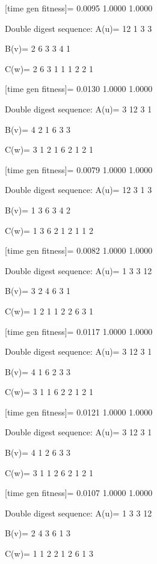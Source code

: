 [time gen fitness]=
    0.0095    1.0000    1.0000

Double digest sequence:
A(u)=
    12     1     3     3

B(v)=
     2     6     3     3     4     1

C(w)=
     2     6     3     1     1     1     2     2     1

[time gen fitness]=
    0.0130    1.0000    1.0000

Double digest sequence:
A(u)=
     3    12     3     1

B(v)=
     4     2     1     6     3     3

C(w)=
     3     1     2     1     6     2     1     2     1

[time gen fitness]=
    0.0079    1.0000    1.0000

Double digest sequence:
A(u)=
    12     3     1     3

B(v)=
     1     3     6     3     4     2

C(w)=
     1     3     6     2     1     2     1     1     2

[time gen fitness]=
    0.0082    1.0000    1.0000

Double digest sequence:
A(u)=
     1     3     3    12

B(v)=
     3     2     4     6     3     1

C(w)=
     1     2     1     1     2     2     6     3     1

[time gen fitness]=
    0.0117    1.0000    1.0000

Double digest sequence:
A(u)=
     3    12     3     1

B(v)=
     4     1     6     2     3     3

C(w)=
     3     1     1     6     2     2     1     2     1

[time gen fitness]=
    0.0121    1.0000    1.0000

Double digest sequence:
A(u)=
     3    12     3     1

B(v)=
     4     1     2     6     3     3

C(w)=
     3     1     1     2     6     2     1     2     1

[time gen fitness]=
    0.0107    1.0000    1.0000

Double digest sequence:
A(u)=
     1     3     3    12

B(v)=
     2     4     3     6     1     3

C(w)=
     1     1     2     2     1     2     6     1     3

